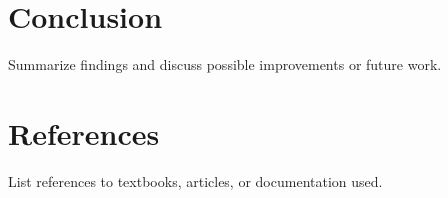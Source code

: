 \documentclass[12pt]{article}
\begin{document}
\section{Conclusion}
Summarize findings and discuss possible improvements or future work.

\section*{References}
List references to textbooks, articles, or documentation used.
\end{document}
